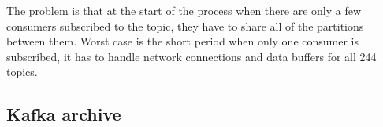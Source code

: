 \documentclass{article}
\begin{document}
The problem is that at the start of the process when there are only a few consumers subscribed to the topic,
they have to share all of the partitions between them. Worst case is the short period when only one
consumer is subscribed, it has to handle network connections and data buffers for all 244 topics.

\subsection{Kafka  archive}
\label{kafka-archive}


\printbibliography
\end{document}
